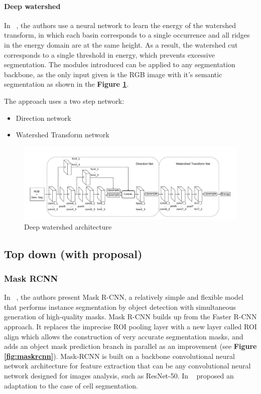 \documentclass[main.tex]{subfiles}
\begin{document}
\paragraph{Deep watershed}In ~\cite{Bai2016}, the authors use a neural network to learn the energy of the watershed transform, in which each basin corresponds to a single occurrence and all ridges in the energy domain are at the same height. As a result, the watershed cut corresponds to a single threshold in energy, which prevents excessive segmentation. The modules introduced can be applied to any segmentation backbone, as the only input given is the RGB image with it's semantic segmentation as shown in the \textbf{Figure \ref{fig:deepwatershed}}.

The approach uses a two step network: 
\begin{itemize}
    \item Direction  network
    \item Watershed Transform network
\end{itemize}

\begin{figure}[H]
    \centering
    \includegraphics[width=16cm]{images/deepwatershed.png}
    \caption{Deep watershed architecture}
    \label{fig:deepwatershed}
\end{figure}



\subsection{Top down (with proposal)}
\subsubsection{Mask RCNN}
In ~\cite{he2017mask}, the authors present Mask R-CNN, a relatively simple and flexible model that performs instance segmentation by object detection with simultaneous generation of high-quality masks. Mask R-CNN builds up from the Faster R-CNN approach. It replaces the imprecise ROI pooling layer with a new layer called ROI align which allows the construction of very accurate segmentation masks, and adds an object mask prediction branch in parallel as an improvement (see \textbf{Figure \ref{fig:maskrcnn}}). Mask-RCNN is built on a backbone convolutional neural network architecture for feature extraction that can be any convolutional neural network designed for images analysis, such as ResNet-50. In ~\cite{johnson2018adapting} proposed an adaptation to the case of cell segmentation.
\end{document}
